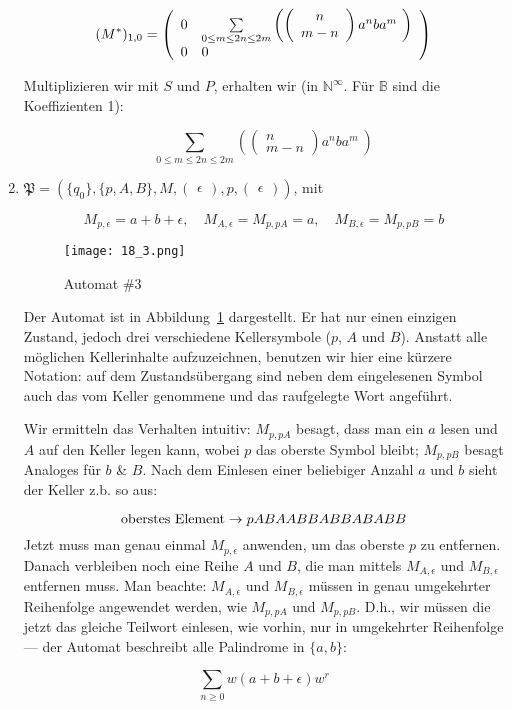 \documentclass[]{scrartcl}
\newcommand{\matr}[2]{\left(\begin{array}{#1}#2\end{array}\right)}
\newcommand{\mt}[1]{\textnormal{#1}}
\renewcommand{\choose}[2]{\left(\begin{array}{c}#1\\#2\end{array}\right)}
\begin{document}
\begin{enumerate}
	$$
		(M^*)_{1,0} =
			\matr{l l}{0 & \sum\limits_{0 \leq m \leq 2n \leq 2m }  \left( \choose{n}{m-n} a^nba^m\ \right)\\
					   0 & 0}
	$$
	
	Multiplizieren wir mit $S$ und $P$, erhalten wir (in $\mathbb{N}^\infty$. Für $\mathbb{B}$ sind die Koeffizienten 1):
	
	$$
	\sum\limits_{0 \leq m \leq 2n \leq 2m }  \left( \choose{n}{m-n} a^nba^m\ \right)
	$$
	
	\newpage
	
	
	\item $
			\mathfrak{P} = (\{q_0\}, \{p,A,B\}, M, \matr{l}{\epsilon}, p, \matr{l}{\epsilon})
		$, mit
		
		$$
			M_{p,\epsilon} = a + b + \epsilon, 
	\quad
			M_{A,\epsilon} = M_{p,pA} = a, 
	\quad
			M_{B,\epsilon} = M_{p,pB} = b
		$$
		
		\begin{figure}[!]
		    \centering
		    \texttt{[image: 18\_3.png]}
		    \caption{Automat \#3}
		    \label{aut3}
		\end{figure}
		
		Der Automat ist in Abbildung~\ref{aut3} dargestellt. Er hat nur einen einzigen Zustand, jedoch drei verschiedene Kellersymbole ($p$, $A$ und $B$). Anstatt alle möglichen Kellerinhalte aufzuzeichnen, benutzen wir hier eine kürzere Notation: auf dem Zustandsübergang sind neben dem eingelesenen Symbol auch das vom Keller genommene und das raufgelegte Wort angeführt. 
		
		Wir ermitteln das Verhalten intuitiv: $M_{p,pA}$ besagt, dass man ein $a$ lesen und $A$ auf den Keller legen kann, wobei $p$ das oberste Symbol bleibt; $M_{p,pB}$ besagt Analoges für $b$ \& $B$. Nach dem Einlesen einer beliebiger Anzahl $a$ und $b$ sieht der Keller z.b. so aus:
		
		$$
			\mt{oberstes Element} \rightarrow pABAABBABBABABB
		$$
		Jetzt muss man genau einmal $M_{p, \epsilon}$ anwenden, um das oberste $p$ zu entfernen. Danach verbleiben noch eine Reihe $A$ und $B$, die man mittels $M_{A, \epsilon}$ und $M_{B, \epsilon}$ entfernen muss. Man beachte: $M_{A,\epsilon}$ und $M_{B,\epsilon}$ müssen in genau umgekehrter Reihenfolge angewendet werden, wie $M_{p,pA}$ und $M_{p,pB}$. D.h., wir müssen die jetzt das gleiche Teilwort einlesen, wie vorhin, nur in umgekehrter Reihenfolge --- der Automat beschreibt alle Palindrome in $\{a,b\}$:
		
		$$
			\sum\limits_{n \geq 0} w (a+b+\epsilon) w^r
		$$
	
\end{enumerate}
\end{document}
